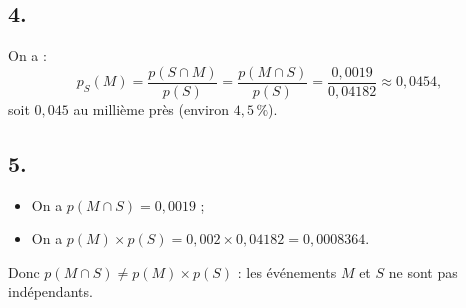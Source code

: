 \subsection*{4.}

On a :
\[
p_S(M) = \dfrac{p(S \cap M)}{p(S)} = \dfrac{p(M \cap S)}{p(S)} = \dfrac{0{,}0019}{0{,}04182} \approx 0{,}0454,
\]
soit \(0{,}045\) au millième près (environ \(4{,}5 \, \% \)).

\subsection*{5.}

\begin{itemize}
    \item On a \( p(M \cap S) = 0{,}0019\) ;
    \item On a \( p(M) \times p(S) = 0{,}002 \times 0{,}04182 = 0{,}0008364\).
\end{itemize}
Donc \( p(M \cap S) \neq p(M) \times p(S) \) : les événements \( M \) et \( S \) ne sont pas indépendants.
